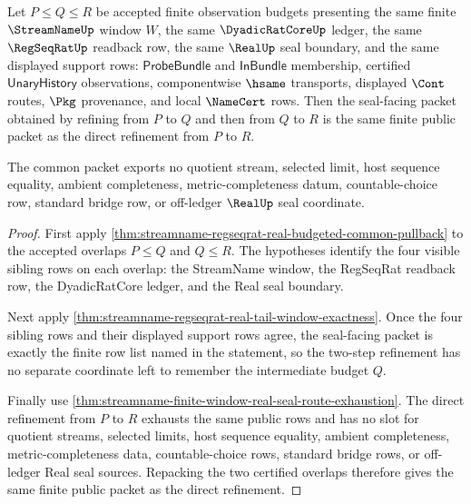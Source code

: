 \begin{theorem}
\label{thm:streamname-finite-window-regular-seal-budget-functoriality}
Let $P \leq Q \leq R$ be accepted finite observation budgets presenting the same finite $\StreamNameUp$ window $W$, the same $\DyadicRatCoreUp$ ledger, the same $\RegSeqRatUp$ readback row, the same $\RealUp$ seal boundary, and the same displayed support rows: $\mathsf{ProbeBundle}$ and $\mathsf{InBundle}$ membership, certified $\mathsf{UnaryHistory}$ observations, componentwise $\hsame$ transports, displayed $\Cont$ routes, $\Pkg$ provenance, and local $\NameCert$ rows. Then the seal-facing packet obtained by refining from $P$ to $Q$ and then from $Q$ to $R$ is the same finite public packet as the direct refinement from $P$ to $R$.

The common packet exports no quotient stream, selected limit, host sequence equality, ambient completeness, metric-completeness datum, countable-choice row, standard bridge row, or off-ledger $\RealUp$ seal coordinate.
\end{theorem}
\begin{proof}
First apply \autoref{thm:streamname-regseqrat-real-budgeted-common-pullback} to the accepted overlaps $P \leq Q$ and $Q \leq R$. The hypotheses identify the four visible sibling rows on each overlap: the StreamName window, the RegSeqRat readback row, the DyadicRatCore ledger, and the Real seal boundary.

Next apply \autoref{thm:streamname-regseqrat-real-tail-window-exactness}. Once the four sibling rows and their displayed support rows agree, the seal-facing packet is exactly the finite row list named in the statement, so the two-step refinement has no separate coordinate left to remember the intermediate budget $Q$.

Finally use \autoref{thm:streamname-finite-window-real-seal-route-exhaustion}. The direct refinement from $P$ to $R$ exhausts the same public rows and has no slot for quotient streams, selected limits, host sequence equality, ambient completeness, metric-completeness data, countable-choice rows, standard bridge rows, or off-ledger Real seal sources. Repacking the two certified overlaps therefore gives the same finite public packet as the direct refinement.
\end{proof}

